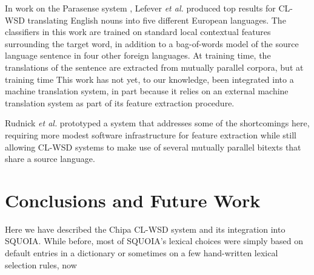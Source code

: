\documentclass[10pt, a4paper]{article}
\begin{document}
In work on the Parasense system \cite{lefever-hoste-decock:2011:ACL-HLT2011},
Lefever \emph{et al.} produced top results for CL-WSD translating English nouns
into five different European languages. The classifiers in this work are
trained on standard local contextual features surrounding the target word,
in addition to a bag-of-words model of the source language sentence in four
other foreign languages. At training time, the translations of the sentence are
extracted from mutually parallel corpora, %
but at training time
This work has not yet, to our knowledge, been integrated into a machine
translation system, in part because it relies on an external machine
translation system as part of its feature extraction procedure.

Rudnick \emph{et al.} 
prototyped a system that addresses some of the shortcomings here, requiring
more modest software infrastructure for feature extraction while still allowing
CL-WSD systems to make use of several mutually parallel bitexts that share a
source language.

\section{Conclusions and Future Work}
Here we have described the Chipa CL-WSD system and its integration into SQUOIA.
While before, most of SQUOIA's lexical choices were simply based on default
entries in a dictionary or sometimes on a few hand-written lexical selection
rules, now 




\end{document}
